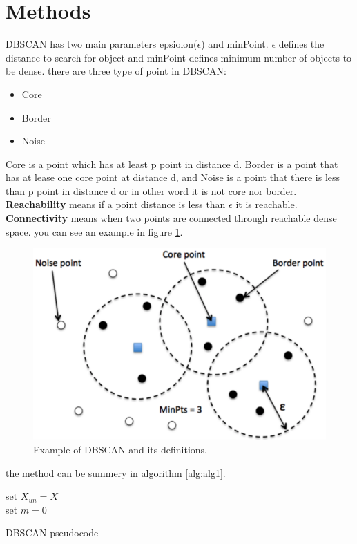 \section{Methods}
DBSCAN has two main parameters epsiolon($\epsilon$) and minPoint.
$\epsilon$ defines the distance to search for object and minPoint defines minimum number of objects to be dense. there are three type of point in DBSCAN:
\begin{itemize}
	\item Core
	\item Border
	\item Noise
\end{itemize}
Core is a point which has at least p point in distance d. Border is a point that has at lease one core point at distance d, and Noise is a point that there is less than p point in distance d or in other word it is not core nor border.
\textbf{Reachability} means if a point distance is less than $\epsilon$ it is reachable.
\textbf{Connectivity} means when two points are connected through reachable dense space. you can see an example in figure \ref{fig:dbscan-example}.
\begin{figure}[h]
	\centering
	\includegraphics[width=0.9\linewidth]{figures/DBSCAN-example}
	\caption{Example of DBSCAN and its definitions\cite{kdnuggetsDBSCAN}.}
	\label{fig:dbscan-example}
\end{figure}
the method can be summery in algorithm \ref{alg:alg1}.

\begin{algorithm}
	set $ X_{un} = X$ \\
	set $ m = 0 $ 
	\caption{DBSCAN pseudocode}
	\label{alg:alg1}
\end{algorithm}